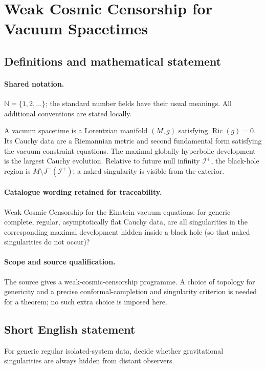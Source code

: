 \documentclass[11pt]{article}
\begin{document}
\section{Weak Cosmic Censorship for Vacuum Spacetimes}\label{statement}

\subsection{Definitions and mathematical statement}

\paragraph{Shared notation.}$\mathbb N=\{1,2,\ldots\}$; the standard number fields have their usual meanings. All additional conventions are stated locally.


A vacuum spacetime is a Lorentzian manifold $(M,g)$ satisfying $\operatorname{Ric}(g)=0$. Its Cauchy data are a Riemannian metric and second fundamental form satisfying the vacuum constraint equations. The maximal globally hyperbolic development is the largest Cauchy evolution. Relative to future null infinity $\mathcal I^+$, the black-hole region is $M\setminus J^-(\mathcal I^+)$; a naked singularity is visible from the exterior.

\paragraph{Catalogue wording retained for traceability.}
Weak Cosmic Censorship for the Einstein vacuum equations: for generic complete, regular, asymptotically flat Cauchy data, are all singularities in the corresponding maximal development hidden inside a black hole (so that naked singularities do not occur)?

\paragraph{Scope and source qualification.}The source gives a weak-cosmic-censorship programme. A choice of topology for genericity and a precise conformal-completion and singularity criterion is needed for a theorem; no such extra choice is imposed here.
\subsection{Short English statement}
For generic regular isolated-system data, decide whether gravitational singularities are always hidden from distant observers.
\end{document}
